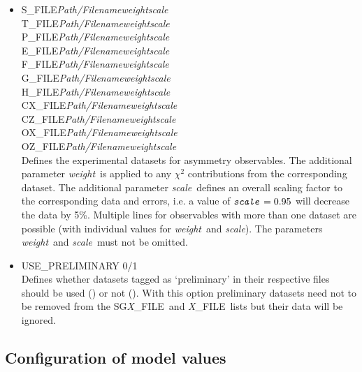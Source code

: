 \documentclass[a4paper,10pt]{article}
\def\bl{\phantom{0}}
\def\tt{\ttfamily}
\def\rm{\rmfamily}
\begin{document}
\begin{itemize}
\item
\tt S\_FILE\bl\bl \textit{Path/Filename}\bl \textit{weight}\bl \textit{scale}\rm\\
\tt T\_FILE\bl\bl \textit{Path/Filename}\bl \textit{weight}\bl \textit{scale}\rm\\
\tt P\_FILE\bl\bl \textit{Path/Filename}\bl \textit{weight}\bl \textit{scale}\rm\\
\tt E\_FILE\bl\bl \textit{Path/Filename}\bl \textit{weight}\bl \textit{scale}\rm\\
\tt F\_FILE\bl\bl \textit{Path/Filename}\bl \textit{weight}\bl \textit{scale}\rm\\
\tt G\_FILE\bl\bl \textit{Path/Filename}\bl \textit{weight}\bl \textit{scale}\rm\\
\tt H\_FILE\bl\bl \textit{Path/Filename}\bl \textit{weight}\bl \textit{scale}\rm\\
\tt CX\_FILE\bl   \textit{Path/Filename}\bl \textit{weight}\bl \textit{scale}\rm\\
\tt CZ\_FILE\bl   \textit{Path/Filename}\bl \textit{weight}\bl \textit{scale}\rm\\
\tt OX\_FILE\bl   \textit{Path/Filename}\bl \textit{weight}\bl \textit{scale}\rm\\
\tt OZ\_FILE\bl   \textit{Path/Filename}\bl \textit{weight}\bl \textit{scale}\rm\\
Defines the experimental datasets for asymmetry observables. The additional
parameter \tt\textit{weight}\rm\ is applied to any $\chi^2$ contributions from the corresponding dataset. The additional
parameter \tt\textit{scale}\rm\ defines an overall scaling factor to the corresponding data and errors, i.e.
a value of $\mbox{\tt\textit{scale}\rm} = 0.95$ will decrease the data by 5\%.
Multiple lines for observables with more than one dataset are possible (with individual values for
\tt\textit{weight}\rm\ and \tt\textit{scale}\rm).
The parameters \tt\textit{weight}\rm\ and \tt\textit{scale}\rm\ must not be omitted.

\item
\tt USE\_PRELIMINARY 0/1\rm\\
Defines whether datasets tagged as `preliminary' in their respective files should be used (\tt1\rm) or not (\tt0\rm).
With this option preliminary datasets need not to be removed from the 
\tt SG\textit{X}\_FILE\rm\ and \tt \textit{X}\_FILE\rm\ lists but their data will be ignored.
\end{itemize}

\subsection{Configuration of model values}
\end{document}
